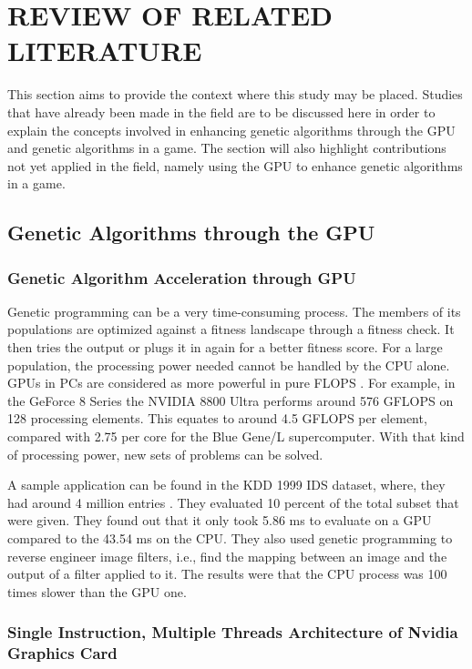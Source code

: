 \chapter{REVIEW OF RELATED LITERATURE}

This section aims to provide the context where this study may be placed. 
Studies that have already been made in the field are to be discussed here in order to 
explain the concepts involved in enhancing genetic algorithms through the GPU and 
genetic algorithms in a game. The section will also highlight contributions not yet 
applied in the field, namely using the GPU to enhance genetic algorithms in a game.


\section{Genetic Algorithms through the GPU}
\subsection{Genetic Algorithm Acceleration through GPU}
Genetic programming can be a very time-consuming process.  The members of its
populations are optimized against a fitness landscape through a fitness check. It
then tries the output or plugs it in again for a better fitness score. For a large
population, the processing power needed cannot be handled by the CPU alone. GPUs in
PCs are considered as more powerful in pure FLOPS \cite{Banzhaf09}.
For example, in the GeForce 8 Series the NVIDIA 8800 Ultra performs around 576 GFLOPS
on 128 processing elements. This equates to around 4.5 GFLOPS per element, compared
with 2.75 per core for the Blue Gene/L supercomputer.  With that kind of processing power, 
new sets of problems can be solved.  

A sample application can be found in the KDD 1999 IDS dataset, where, they had around
4 million entries \cite{Banzhaf09}. They evaluated 10 percent of the total subset
that were given. They found out that it only took 5.86 ms to evaluate on a GPU
compared to the 43.54 ms on the CPU. They also used genetic programming to
reverse engineer image filters, i.e., find the mapping between an image and the
output of a filter applied to it. The results were that the CPU process was 100
times slower than the GPU one. 

\subsection{Single Instruction, Multiple Threads Architecture of Nvidia
Graphics Card}



